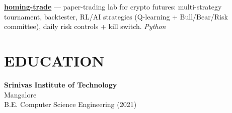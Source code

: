 \documentclass[a4paper,10pt]{article}
\begin{document}
\begin{minipage}[t]{0.37\textwidth}
\href{https://github.com/NeuronEnix/homing-trade}{\textbf{homing-trade}} --- paper-trading lab for crypto futures: multi-strategy tournament, backtester, RL/AI strategies (Q-learning + Bull/Bear/Risk committee), daily risk controls + kill switch. \textit{Python}

\section*{EDUCATION}
\textbf{Srinivas Institute of Technology}\\
Mangalore\\
B.E. Computer Science Engineering (2021)

\end{minipage}
\end{document}
